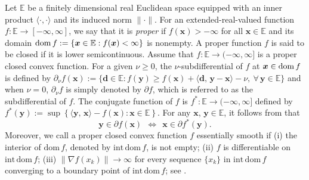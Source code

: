 \documentclass[10pt]{article}
\newcommand{\red}[1]{\begin{color}{red}#1\end{color}}
\begin{document}
Let $\mathbb{E}$ be a finitely dimensional real Euclidean space equipped with an inner product $\langle\cdot, \cdot\rangle$ and its induced norm $\|\cdot\|$. For an extended-real-valued function $f: \mathbb{E} \rightarrow [-\infty,\infty]$, we say that it is \textit{proper} if $f(\bm{x}) > -\infty$ for all $\bm{x} \in \mathbb{E}$ and its domain ${\rm dom}\,f:=\{\bm{x} \in \mathbb{E} : f(\bm{x}) < \infty\}$ is nonempty. A proper function $f$ is said to be closed if it is lower semicontinuous. Assume that $f: \mathbb{E} \rightarrow (-\infty, \infty]$ is a proper closed convex function. For a given $\nu \geq 0$, the $\nu$-subdifferential of $f$ at $\bm{x}\in{\rm dom}\,f$ is defined by $\partial_\nu f(\bm{x}):=\{\bm{d}\in\mathbb{E}: f(\bm{y}) \geq f(\bm{x}) + \langle \bm{d}, \,\bm{y}-\bm{x}  \rangle -\nu, ~\forall\,\bm{y}\in\mathbb{E}\}$ and when $\nu=0$, $\partial_\nu f$ is simply denoted by $\partial f$, which is referred to as the subdifferential of $f$. The conjugate function of $f$ is $f^*: \mathbb{E} \rightarrow (-\infty,\infty]$ defined by $f^*(\bm{y}):=\sup\left\{\langle \bm{y},\,\bm{x}\rangle-f(\bm{x}) : \bm{x}\in\mathbb{E}\right\}$. For any $\bm{x}$, $\bm{y}\in\mathbb{E}$, it follows from \cite[Theorem 23.5]{r1970convex} that
\begin{equation}\label{subeqv}
\bm{y} \in \partial f(\bm{x}) ~~\Longleftrightarrow~~ \bm{x} \in \partial f^*(\bm{y}).
\end{equation}
Moreover, we call a proper closed convex function $f$ essentially smooth if (i) the interior of $\mathrm{dom}\,f$, denoted by $\mathrm{int}\,\mathrm{dom}\,f$, is not empty; (ii) $f$ is differentiable on $\mathrm{int}\,\mathrm{dom}\,f$; (iii) $\|\nabla f(x_k)\|\to\infty$ for every sequence $\{x_k\}$ in $\mathrm{int}\,\mathrm{dom}\,f$ converging to a boundary point of $\mathrm{int}\,\mathrm{dom}\,f$; see \cite[page 251]{r1970convex}.

\end{document}

